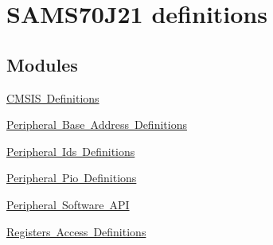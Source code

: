 \hypertarget{group__SAMS70J21__definitions}{}\section{S\+A\+M\+S70\+J21 definitions}
\label{group__SAMS70J21__definitions}
\subsection*{Modules}
\begin{DoxyCompactItemize}
\item 
\mbox{\hyperlink{group__SAMS70J21__cmsis}{C\+M\+S\+I\+S Definitions}}
\item 
\mbox{\hyperlink{group__SAMS70J21__base}{Peripheral Base Address Definitions}}
\item 
\mbox{\hyperlink{group__SAMS70J21__id}{Peripheral Ids Definitions}}
\item 
\mbox{\hyperlink{group__SAMS70J21__pio}{Peripheral Pio Definitions}}
\item 
\mbox{\hyperlink{group__SAMS70J21__api}{Peripheral Software A\+PI}}
\item 
\mbox{\hyperlink{group__SAMS70J21__reg}{Registers Access Definitions}}
\end{DoxyCompactItemize}
